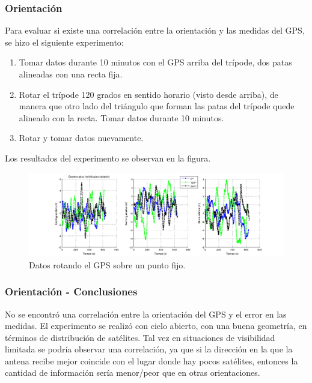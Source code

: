 \documentclass[spanish,12pt,a4paper,titlepage]{report}
\begin{document}
\newpage
\subsubsection{Orientación}
\label{sec:gps-orientacion}

Para evaluar si existe una correlación entre la orientación y las medidas del GPS, se hizo el siguiente experimento:
\begin{enumerate}
\item Tomar datos durante 10 minutos con el GPS arriba del trípode, dos patas alineadas con una recta fija.
\item Rotar el trípode 120 grados en sentido horario (visto desde arriba), de manera que otro lado del triángulo que forman las patas del trípode quede alineado con la recta. Tomar datos durante 10 minutos.
\item Rotar y tomar datos nuevamente.
\end{enumerate}

Los resultados del experimento se observan en la figura.

\begin{figure}[h!]
\hspace{-70pt}
  \includegraphics[width=1.4\textwidth]{./img/orientacion_individual.png}
  \caption{Datos rotando el GPS sobre un punto fijo.}
  \label{fig:orientacion_individual.png}
\end{figure}

\subsubsection{Orientación - Conclusiones}
\label{sec:orientacion-conclusiones}

No se encontró una correlación entre la orientación del GPS y el error en las medidas.
El experimento se realizó con cielo abierto, con una buena geometría, en términos de distribución de satélites. Tal vez en situaciones de visibilidad limitada se podría observar una correlación, ya que si la dirección en la que la antena recibe mejor coincide con el lugar donde hay pocos satélites, entonces la cantidad de información sería menor/peor que en otras orientaciones.
\end{document}
